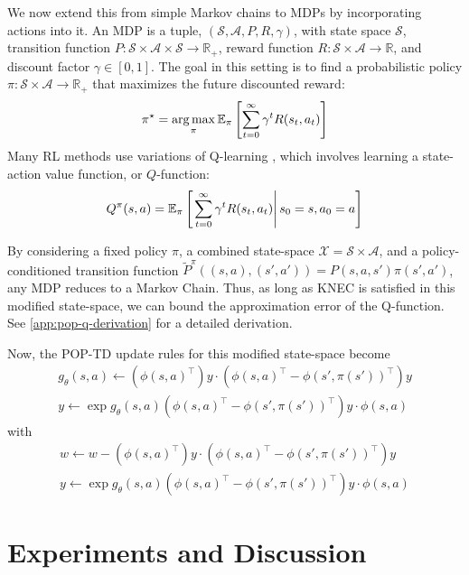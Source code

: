We now extend this from simple Markov chains to MDPs by incorporating actions into it. An MDP is a tuple, $(\mathcal{S}, \mathcal{A}, P, R, \gamma)$, with state space $\mathcal S$, transition function $P : \mathcal{S} \times \mathcal{A} \times \mathcal{S} \to \mathbb{R}_+$, reward function $R : \mathcal S \times \mathcal{A} \to \mathbb R$, and discount factor $\gamma \in [0, 1]$.
The goal in this setting is to find a probabilistic policy $\pi : \mathcal{S} \times \mathcal{A} \to \mathbb{R}_+$ that maximizes the future discounted reward:
\begin{equation}
    \pi^\star = \operatorname*{arg\,max}_\pi \mathbb{E}_\pi \left [ \sum_{t=0}^\infty \gamma^t R(s_t, a_t) \right ]
\end{equation}
Many RL methods use variations of Q-learning \cite{kumar2020cql,watkins1992q,mnih2013playing,haarnoja2018soft}, which involves learning a state-action value function, or $Q$-function:
\begin{equation}
    Q^\pi(s, a) = \mathbb{E}_\pi \left[\left.\sum_{t=0}^\infty \gamma^t R(s_t, a_t) \right| s_0 = s, a_0 = a \right]
\end{equation}

By considering a fixed policy $\pi$, a combined state-space $\mathcal{X} = \mathcal{S} \times \mathcal{A}$, and a policy-conditioned transition function $\tilde{P}^\pi((s, a), (s', a')) = P(s, a, s') \pi(s', a')$, any MDP reduces to a Markov Chain.
Thus, as long as KNEC is satisfied in this modified state-space, we can bound the approximation error of the Q-function.
See \cref{app:pop-q-derivation} for a detailed derivation.

Now, the POP-TD update rules for this modified state-space become
\begin{align}
  g_\theta(s, a) \gets (\phi(s, a)^\top) y \cdot (\phi(s,a )^\top - \phi(s', \pi(s'))^\top) y \\
  y \gets \exp{g_\theta(s,a)} (\phi(s,a)^\top - \phi(s', \pi(s'))^\top) y \cdot \phi(s, a)
\end{align}
with
\begin{align}
  w \gets w - (\phi(s, a)^\top) y \cdot (\phi(s,a )^\top - \phi(s', \pi(s'))^\top) y \\
  y \gets \exp{g_\theta(s,a)} (\phi(s,a)^\top - \phi(s', \pi(s'))^\top) y \cdot \phi(s, a)
\end{align}


\section{Experiments and Discussion}

